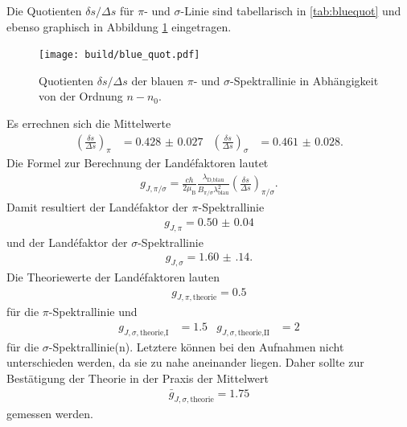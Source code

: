 Die Quotienten $\delta s/\Delta s$ für $\pi$- und $\sigma$-Linie sind tabellarisch in \ref{tab:bluequot} und ebenso
graphisch in Abbildung \ref{fig:bluequot} eingetragen.

\begin{figure}[H]
  \centering
  \texttt{[image: build/blue\_quot.pdf]}
  \caption{Quotienten $\delta s/\Delta s$ der blauen $\pi$- und $\sigma$-Spektrallinie in Abhängigkeit von der Ordnung $n-n_0$.}
  \label{fig:bluequot}
\end{figure}

Es errechnen sich die Mittelwerte
\begin{align}
  \left(\frac{\delta s}{\Delta s}\right)_\pi &= \num{0.428(27)} & \left(\frac{\delta s}{\Delta s}\right)_\sigma &= \num{0.461(28)}.
\end{align}
Die Formel zur Berechnung der Landéfaktoren lautet
\begin{align}
  g_{J,\pi/\sigma} = \frac{c h}{2 \mu_\text{B}} \frac{\lambda_\text{D,blau}}{B_{\pi/\sigma} \lambda_\text{blau}^2} \left(\frac{\delta s}{\Delta s}\right)_{\pi/\sigma}.
\end{align}
Damit resultiert der Landéfaktor der $\pi$-Spektrallinie
\begin{align}
  g_{J,\pi} = \num{0.50(4)}
\end{align}
und der Landéfaktor der $\sigma$-Spektrallinie
\begin{align}
  g_{J,\sigma} = \num{1.60(14)}.
\end{align}
Die Theoriewerte der Landéfaktoren lauten
\begin{align}
  g_{J,\pi,\text{theorie}} = 0.5
\end{align}
für die $\pi$-Spektrallinie und
\begin{align}
  g_{J,\sigma,\text{theorie,I}} &= 1.5 & g_{J,\sigma,\text{theorie,II}} &= 2
\end{align}
für die $\sigma$-Spektrallinie(n). Letztere können bei den Aufnahmen nicht unterschieden
werden, da sie zu nahe aneinander liegen. Daher sollte zur Bestätigung der Theorie in der
Praxis der Mittelwert
\begin{align}
  \bar{g}_{J,\sigma,\text{theorie}} = 1.75
\end{align}
gemessen werden.
